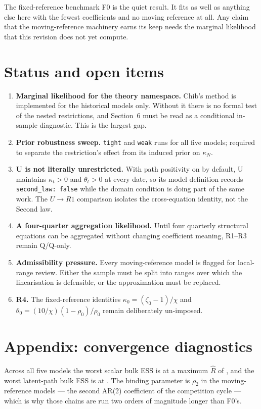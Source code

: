 \documentclass[11pt]{article}
\newcommand{\code}[1]{\texttt{#1}}
\newcommand{\kt}{\kappa_t}
\begin{document}
The fixed-reference benchmark F0 is the quiet result. It fits as well as
anything else here with the fewest coefficients and no moving reference at all.
Any claim that the moving-reference machinery earns its keep needs the marginal
likelihood that this revision does not yet compute.

\section{Status and open items}\label{sec:open}
\begin{enumerate}
  \item \textbf{Marginal likelihood for the theory namespace.} Chib's method is
    implemented for the historical models only. Without it there is no formal
    test of the nested restrictions, and Section~6 must be read as a
    conditional in-sample diagnostic. This is the largest gap.
  \item \textbf{Prior robustness sweep.} \code{tight} and \code{weak} runs for
    all five models; required to separate the restriction's effect from its
    induced prior on $\kappa_N$.
  \item \textbf{U is not literally unrestricted.} With path positivity on by
    default, U maintains $\kt>0$ and $\theta_t>0$ at every date, so its model
    definition records \code{second\_law: false} while the domain condition is
    doing part of the same work. The $U\to R1$ comparison isolates the
    cross-equation identity, not the Second law.
  \item \textbf{A four-quarter aggregation likelihood.} Until four quarterly
    structural equations can be aggregated without changing coefficient meaning,
    R1--R3 remain Q/Q-only.
  \item \textbf{Admissibility pressure.} Every moving-reference model is flagged
    for local-range review. Either the sample must be split into ranges over
    which the linearisation is defensible, or the approximation must be replaced.
  \item \textbf{R4.} The fixed-reference identities $\kappa_0=(\zeta_0-1)/\chi$
    and $\theta_0=(10/\chi)(1-\rho_0)/\rho_0$ remain deliberately un-imposed.
\end{enumerate}

\appendix
\section{Appendix: convergence diagnostics}
Across all five models the worst scalar bulk ESS is \TheoryWorstScalarESS{} at a
maximum $\hat R$ of \TheoryWorstScalarRhat, and the worst latent-path bulk ESS is
\TheoryWorstPathESS{} at \TheoryWorstPathRhat. The binding parameter is $\rho_2$
in the moving-reference models --- the second AR(2) coefficient of the
competition cycle --- which is why those chains are run two orders of magnitude
longer than F0's.
\end{document}
